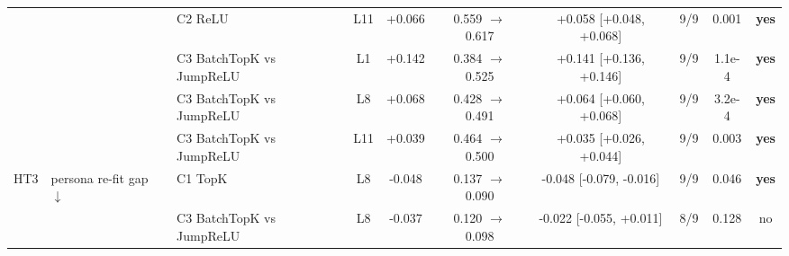 \begin{table}[t]
\begin{adjustbox}{max width=\linewidth}
\begin{tabular}{lllccccccc}
 &  & C2 ReLU & L11 & +0.066 & 0.559 $\rightarrow$ 0.617 & +0.058 [+0.048, +0.068] & 9/9 & 0.001 & \textbf{yes} \\
 &  & C3 BatchTopK vs JumpReLU & L1 & +0.142 & 0.384 $\rightarrow$ 0.525 & +0.141 [+0.136, +0.146] & 9/9 & 1.1e-4 & \textbf{yes} \\
 &  & C3 BatchTopK vs JumpReLU & L8 & +0.068 & 0.428 $\rightarrow$ 0.491 & +0.064 [+0.060, +0.068] & 9/9 & 3.2e-4 & \textbf{yes} \\
 &  & C3 BatchTopK vs JumpReLU & L11 & +0.039 & 0.464 $\rightarrow$ 0.500 & +0.035 [+0.026, +0.044] & 9/9 & 0.003 & \textbf{yes} \\
HT3 & persona re-fit gap $\downarrow$ & C1 TopK & L8 & -0.048 & 0.137 $\rightarrow$ 0.090 & -0.048 [-0.079, -0.016] & 9/9 & 0.046 & \textbf{yes} \\
 &  & C3 BatchTopK vs JumpReLU & L8 & -0.037 & 0.120 $\rightarrow$ 0.098 & -0.022 [-0.055, +0.011] & 8/9 & 0.128 & no \\
\bottomrule
\end{tabular}
\end{adjustbox}
\end{table}
